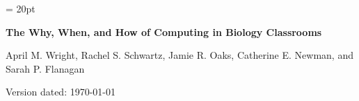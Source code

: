 \documentclass[11pt]{article}
\begin{document}
\renewcommand{\headrulewidth}{0.5pt}
\headsep = 20pt
\lhead{ }

\thispagestyle{plain}
\begin{center}

\textbf{\LARGE The Why, When, and How of Computing in Biology Classrooms}\\\vspace{2mm}

\vspace{1cm}
{\Large April M. Wright, Rachel S. Schwartz, Jamie R. Oaks, Catherine E. Newman, and Sarah P. Flanagan}
\vspace{1cm}
\end{center}

\def \ResourcePath {./}
\def \GlobalResourcePath {.}


Version dated: \today
\end{document}
